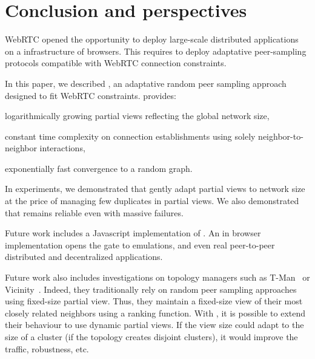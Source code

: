 
\section{Conclusion and perspectives}
\label{sec:conclusion}

WebRTC opened the opportunity to deploy large-scale distributed
applications on a infrastructure of browsers. This requires to deploy
adaptative peer-sampling protocols compatible with WebRTC connection
constraints.

In this paper, we described \SPRAY, an adaptative random peer sampling
approach designed to fit WebRTC constraints.  \SPRAY provides:
\begin{inparaenum}[(i)]
\item logarithmically growing partial views reflecting the global network size,
\item constant time complexity on connection establishments using solely
  neighbor-to-neighbor interactions,
\item exponentially fast convergence to a random graph.
\end{inparaenum}

In experiments, we demonstrated that \SPRAY gently adapt partial views
to network size at the price of managing few duplicates in partial
views. We also demonstrated that \SPRAY remains reliable even with
massive failures.



Future work includes a Javascript implementation of \SPRAY. An in
browser implementation opens the gate to emulations, and even
real peer-to-peer distributed and decentralized applications.

Future work also includes investigations on topology managers such as
T-Man~\cite{jelasity2009tman} or
Vicinity~\cite{voulgaris2005epidemic}. Indeed, they traditionally rely
on random peer sampling approaches using fixed-size partial
view. Thus, they maintain a fixed-size view of their most closely
related neighbors using a ranking function. With \SPRAY, it is
possible to extend their behaviour to use dynamic partial views. If
the view size could adapt to the size of a cluster (if the topology
creates disjoint clusters), it would improve the traffic, robustness,
etc.


